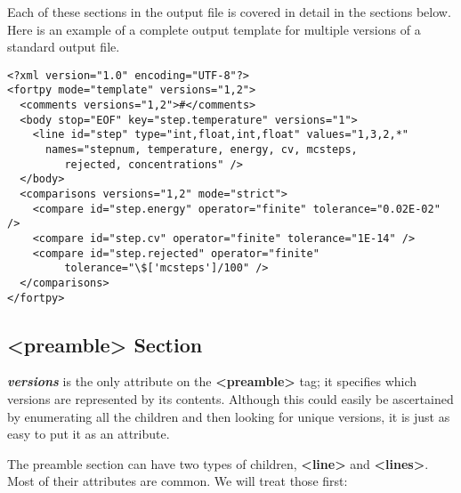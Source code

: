 \documentclass[paper=a4, fontsize=11pt]{scrartcl} %
\numberwithin{equation}{section} %
\numberwithin{figure}{section} %
\numberwithin{table}{section} %
\begin{document}
Each of these sections in the output file is covered in detail in the sections below. Here is an
example of a complete output template for multiple versions of a standard output file.

\begin{lstlisting}
<?xml version="1.0" encoding="UTF-8"?>
<fortpy mode="template" versions="1,2">
  <comments versions="1,2">#</comments>
  <body stop="EOF" key="step.temperature" versions="1">
    <line id="step" type="int,float,int,float" values="1,3,2,*" 
	  names="stepnum, temperature, energy, cv, mcsteps, 
		 rejected, concentrations" />
  </body>
  <comparisons versions="1,2" mode="strict">
    <compare id="step.energy" operator="finite" tolerance="0.02E-02" />
    <compare id="step.cv" operator="finite" tolerance="1E-14" />
    <compare id="step.rejected" operator="finite" 
	     tolerance="\$['mcsteps']/100" />
  </comparisons>
</fortpy>
\end{lstlisting}

\subsection{<preamble> Section}

\textbf{\textit{versions}} is the only attribute on the \textbf{<preamble>} tag; it specifies
which versions are represented by its contents. Although this could easily be ascertained by
enumerating all the children and then looking for unique versions, it is just as easy to put
it as an attribute.

The preamble section can have two types of children, \textbf{<line>} and \textbf{<lines>}. Most
of their attributes are common. We will treat those first:
\end{document}

